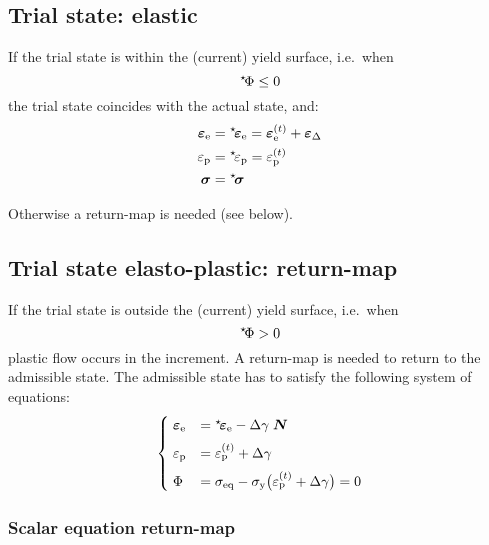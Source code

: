 \documentclass[times]{goose-article}
\newcommand\leftstar[1]{\hspace*{-.3em}~^\star\!#1}
\begin{document}
\subsection{Trial state: elastic}

If the trial state is within the (current) yield surface, i.e.\ when
\begin{equation}
  \leftstar{\Phi} \leq 0
\end{equation}
the trial state coincides with the actual state, and:
\begin{align}
  \bm{\varepsilon}_\mathrm{e}
  &= \leftstar{\bm{\varepsilon}}_\mathrm{e}
   = \bm{\varepsilon}_\mathrm{e}^{(t)} + \bm{\varepsilon}_\Delta
  \\
  \varepsilon_\mathrm{p}
  &= \leftstar{\varepsilon}_\mathrm{p}
   = \varepsilon_\mathrm{p}^{(t)}
  \\
  \bm{\sigma}
  &= \leftstar{\bm{\sigma}}
\end{align}

Otherwise a return-map is needed (see below).

\subsection{Trial state elasto-plastic: return-map}

If the trial state is outside the (current) yield surface, i.e.\ when
\begin{equation}
  \leftstar{\Phi} > 0
\end{equation}
plastic flow occurs in the increment. A return-map is needed to return to the admissible state. The admissible state has to satisfy the following system of equations:
\begin{equation}
\begin{cases}
  \; \bm{\varepsilon}_\mathrm{e}
    &= \leftstar\bm{\varepsilon}_\mathrm{e}
     - \Delta \gamma \; \bm{N}
  \\[2mm]
  \; \varepsilon_\mathrm{p}
    &= \varepsilon_\mathrm{p}^{(t)} + \Delta \gamma
  \\[2mm]
  \; \Phi
    &= \sigma_\mathrm{eq}
     - \sigma_\mathrm{y} \big( \varepsilon_\mathrm{p}^{(t)} + \Delta\gamma \big)
     = 0
\end{cases}
\end{equation}

\subsubsection{Scalar equation return-map}
\end{document}
